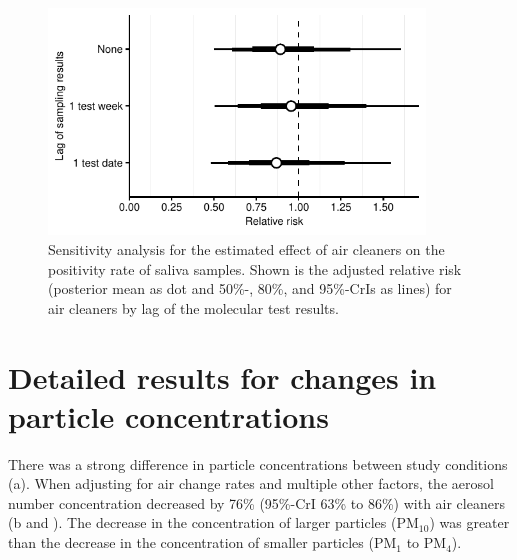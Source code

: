 \documentclass[fleqn,11pt]{wlscirep_supp}
\begin{document}
\begin{figure}[!htb]
\centering
    \includegraphics[width=10cm]{../../results/mol-data/model-results.pdf}
    \caption[Sensitivity analysis for the estimated effect of air cleaners on the positivity rate of saliva samples]{Sensitivity analysis for the estimated effect of air cleaners on the positivity rate of saliva samples. Shown is the adjusted relative risk (posterior mean as dot and 50\%-, 80\%, and 95\%-CrIs as lines) for air cleaners by lag of the molecular test results.}
    \label{fig:mol-estimation-results-sensitivity}
\end{figure}

\clearpage

\section{Detailed results for changes in particle concentrations}\label{sec:detailed-palas}

There was a strong difference in particle concentrations between study conditions (a). When adjusting for air change rates and multiple other factors, the aerosol number concentration decreased by 76\% (95\%-CrI 63\% to 86\%) with air cleaners (b and ). The decrease in the concentration of larger particles (PM$_{10}$) was greater than the decrease in the concentration of smaller particles (PM$_1$ to PM$_{4}$). 
\end{document}
